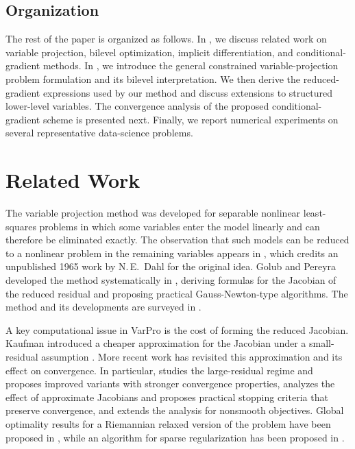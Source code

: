 \documentclass{article}
\begin{document}
\subsection{Organization}
The rest of the paper is organized as follows. In
, we discuss related work on variable projection, bilevel optimization, implicit differentiation, and conditional-gradient methods. In , we introduce the general constrained variable-projection problem formulation and its bilevel interpretation. We then derive
the reduced-gradient expressions used by our method and discuss extensions to structured lower-level variables. The convergence analysis of the proposed conditional-gradient scheme is presented next. Finally, we report numerical experiments on several representative data-science problems.




\section{Related Work}\label{sec:related-work}
The variable projection method was developed for separable nonlinear least-squares problems in which some variables enter the model linearly and can therefore be eliminated exactly. The observation that such models can be reduced to a nonlinear problem in the remaining variables appears in \cite{lawton_varpro}, which credits an unpublished 1965 work by N.\,E.~Dahl for the original idea. Golub and Pereyra developed the method systematically in \cite{Gobub_Pereyra_varpro}, deriving formulas for the Jacobian of the reduced residual and proposing practical Gauss-Newton-type algorithms. The method and
its developments are surveyed in \cite{golub2003separable}.

A key computational issue in VarPro is the cost of forming the reduced Jacobian. Kaufman introduced a cheaper approximation for the Jacobian under a small-residual assumption \cite{Kaufman1975}. More recent work has revisited this approximation and its effect on convergence. In particular, \cite{CHEN2025112300} studies the large-residual regime and proposes improved variants with stronger convergence
properties, \cite{espanol2025local} analyzes the effect of approximate Jacobians and proposes practical stopping criteria that preserve convergence, and \cite{Leewen_varprononsmooth} extends the analysis for nonsmooth objectives. Global optimality results for a Riemannian relaxed version of the problem have been proposed in \cite{dus2026grassmanniangeometryglobalconvergence}, while an algorithm for sparse regularization has been proposed in \cite{Xu2024}.
\end{document}
